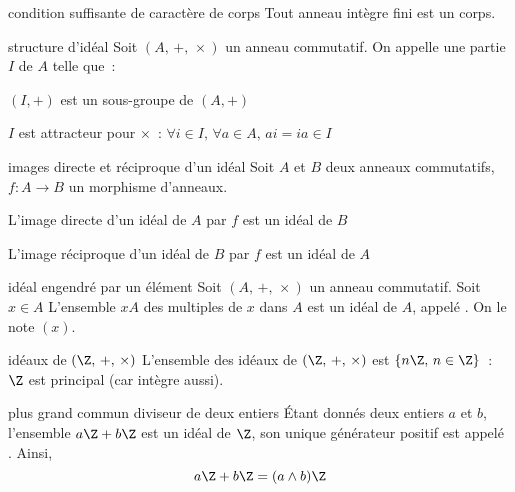 \begin{adjustwidth}{-3cm}{-3cm}
\begin{proposition}{2.29}{condition suffisante de caractère de corps}
    Tout anneau intègre fini est un corps.
\end{proposition}

\begin{definition}{2.30}{structure d'idéal}
    Soit $(A,\, +,\, \times)$ un anneau commutatif. On appelle  une partie $I$ de $A$ telle que~:
    \begin{enumeratebf}
        \item $(I,+)$ est un sous-groupe de $(A,+)$
        \item $I$ est attracteur pour $\times$~: $\forall i \in I,\, \forall a \in A,\, ai = ia \in I$
    \end{enumeratebf}
\end{definition}

\begin{proposition}{2.32}{images directe et réciproque d'un idéal}
    Soit $A$ et $B$ deux anneaux commutatifs, $f:A\to B$ un morphisme d'anneaux.
    \begin{enumeratebf}
        \item L'image directe d'un idéal de $A$ par $f$ est un idéal de $B$
        \item L'image réciproque d'un idéal de $B$ par $f$ est un idéal de $A$
    \end{enumeratebf}
\end{proposition}

\begin{definition}{2.34}{idéal engendré par un élément}
    Soit $(A,\, +,\, \times)$ un anneau commutatif. Soit $x \in A$
    L'ensemble $xA$ des multiples de $x$ dans $A$ est un idéal de $A$, appelé . On le note $(x)$.
\end{definition}

\begin{theoreme}{2.36}{idéaux de $(\Z,\, +,\, \times)$}
    L'ensemble des idéaux de $(\Z,\, +,\, \times)$ est $\{n\Z,\, n \in \Z\}$~: $\Z$ est principal (car intègre aussi).
\end{theoreme}

\begin{definition}{2.37}{plus grand commun diviseur de deux entiers}
    Étant donnés deux entiers $a$ et $b$, l'ensemble $a\Z + b\Z$ est un idéal de $\Z$, son unique générateur positif est appelé . Ainsi,\, 
    $$a\Z + b\Z = (a\wedge b) \Z$$
\end{definition}


\end{adjustwidth}
